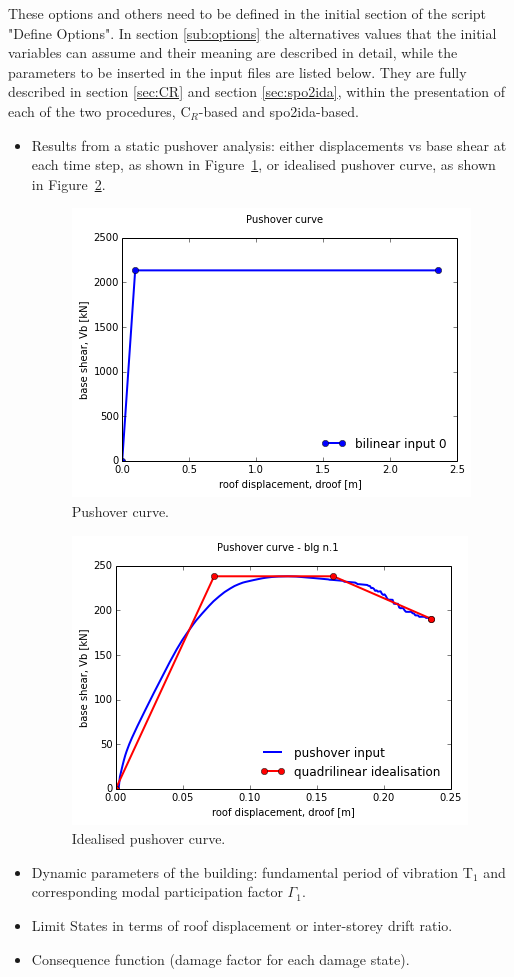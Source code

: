 These options and others need to be defined in the initial section of the script "Define Options". In section \ref{sub:options} the alternatives values that the initial variables can assume and their meaning are described in detail, while the parameters to be inserted in the input files are listed below. They are fully described in section \ref{sec:CR} and section \ref{sec:spo2ida}, within the presentation of each of the two procedures, C$_R$-based and spo2ida-based.

\begin{itemize}
\item Results from a static pushover analysis: either displacements vs base shear at each time step, as shown in Figure~\ref{fig:expPushover}, or idealised pushover curve, as shown in Figure~\ref{fig:expIdealised}.

\begin{figure}[H]
\centering
\includegraphics{./figures/IdealisedCurve.png}
\caption{Pushover curve.}
\label{fig:expPushover}
\end{figure}

\begin{figure}[H]
\centering
\includegraphics{./figures/PushoverCurve.png}
\caption{Idealised pushover curve.}
\label{fig:expIdealised}
\end{figure}

\item Dynamic parameters of the building: fundamental period of vibration T$_1$ and corresponding modal participation factor $\Gamma_1$.
\item Limit States in terms of roof displacement or inter-storey drift ratio.
\item Consequence function (damage factor for each damage state).
\end{itemize}

